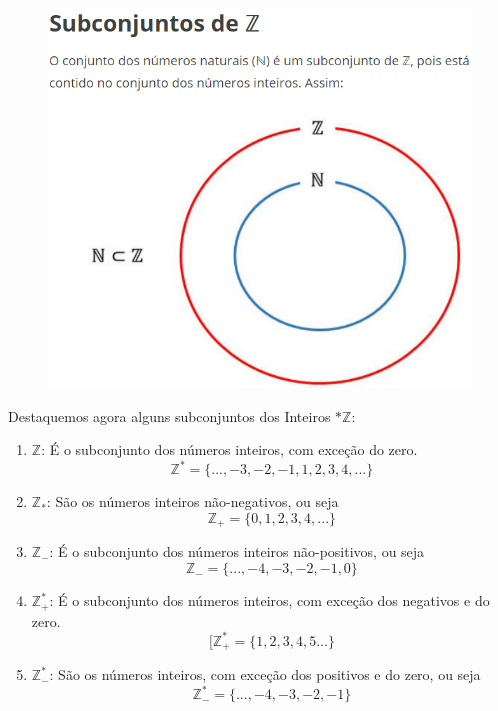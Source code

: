 \begin{multicols*}{2}
	\begin{figure}[H]
		\centering
		\includegraphics[width=\columnwidth]{assets/Conjunto dos Inteiros Mais os Naturais Nele Contido.png}
	\end{figure}

	Destaquemos agora alguns subconjuntos dos Inteiros $*\mathbb{Z}$:

	\begin{enumerate}

		\item $\mathbb{Z}$: É o subconjunto dos números inteiros, com exceção do zero. \[\mathbb{Z}^* = \{..., -3,-2,-1, 1, 2, 3, 4, ...\}\]

		\item $\mathbb{Z}_*$: São os números inteiros não-negativos, ou seja \[\mathbb{Z}_+ = \{0, 1, 2, 3, 4, ...\}\]

		\item $\mathbb{Z}_-$: É o subconjunto dos números inteiros não-positivos, ou seja \[\mathbb{Z}_- = \{..., -4,-3,-2,-1, 0\}\]

		\item $\mathbb{Z}^*_+ $: É o subconjunto dos números inteiros, com exceção dos negativos e do zero.\[[\mathbb{Z}^*_+ = \{1,2,3,4, 5...\}\]

		\item $\mathbb{Z}^*_- $: São os números inteiros, com exceção dos positivos e do zero, ou seja \[\mathbb{Z}^*_- = \{..., -4,-3,-2,-1\}\]


\end{enumerate}
\end{multicols*}
